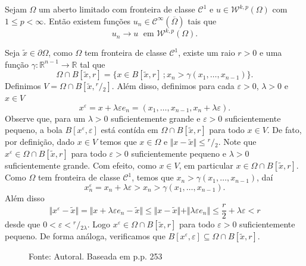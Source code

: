\documentclass[a4paper, 11pt]{book}
\theoremstyle{definition}
\newcommand{\bR}{\mathbb{R}}
\newcommand{\cC}{\mathcal{C}}
\newcommand{\cW}{\mathcal{W}}
\newcommand{\sfrac}[2]{{}^{#1}\!\!/\!_{#2}}
\begin{document}
\begin{tbox}
    Sejam $\Omega$ um aberto limitado com fronteira de classe $\cC^1$ e $u \in \cW^{k,p}(\Omega)$ com $1 \leqslant p < \infty$.
    Então existem funções $u_n \in \cC^\infty(\overline\Omega)$ tais que
    \[
        u_n \to u \;\text{ em } \cW^{k,p}(\Omega).
    \]
\end{tbox}
\begin{prf}
    Seja $\tilde x \in \partial \Omega$, como $\Omega$ tem fronteira de classe $\cC^1$, existe um raio $r > 0$ e uma função $\gamma : \bR^{n-1} \to \bR$ tal que
    \[
        \Omega \cap B[\tilde x, r] = \{x \in B[\tilde x, r] \,; x_n > \gamma(x_1,\dots,x_{n-1})\}.
    \]
    Definimos $V = \Omega \cap B[\tilde x, \sfrac{r}{2}]$.
    Além disso, definimos para cada $\varepsilon > 0$, $\lambda > 0$ e $x \in V$
    \[
        x^\varepsilon = x + \lambda \varepsilon e_n = (x_1,\dots,x_{n-1}, x_n + \lambda\varepsilon).
    \]
    Observe que, para um $\lambda > 0$ suficientemente grande e $\varepsilon > 0$ suficientemente pequeno, a bola $B[x^\varepsilon\!,\varepsilon]$ está contída em $\Omega \cap B[\tilde x,r]$ para todo $x \in V$.
    De fato, por definição, dado $x \in V$ temos que $x \in \Omega$ e $\Vert x - \tilde x \Vert \leqslant \sfrac{r}{2}$.
    Note que $x^\varepsilon \in \Omega \cap B[\tilde x, r]$ para todo $\varepsilon > 0$ suficientemente pequeno e $\lambda > 0$ suficientemente grande.
    Com efeito, como $x \in V$, em particular $x \in \Omega \cap B[\tilde x, r]$.
    Como $\Omega$ tem fronteira de classe $\cC^1$, temos que $x_n > \gamma(x_1,\dots,x_{n-1})$, daí
    \[
        x^\varepsilon_n = x_n + \lambda \varepsilon > x_n >  \gamma(x_{1},\dots,x_{n-1}).
    \]
    Além disso
    \[
        \Vert x^\varepsilon - \tilde x \Vert = \Vert x + \lambda \varepsilon e_n - \tilde x \Vert \leqslant \Vert x - \tilde x \Vert + \Vert \lambda \varepsilon e_n  \Vert \leqslant \frac{r}{2} + \lambda\varepsilon < r
    \]
    desde que $0 <\varepsilon < \sfrac{r}{2\lambda}$.
    Logo $x^\varepsilon \in \Omega \cap B[\tilde x, r]$ para todo $\varepsilon > 0$ suficientemente pequeno.
    De forma análoga, verificamos que
    $B[x^\varepsilon\!, \varepsilon] \subseteq \Omega \cap B[\tilde x,r]$.
    \begin{figure}
        \centering
        
        \caption{Fonte: Autoral. Baseada em \cite{evans-pde} p.p. 253}
    \end{figure}


\end{prf}
\end{document}
